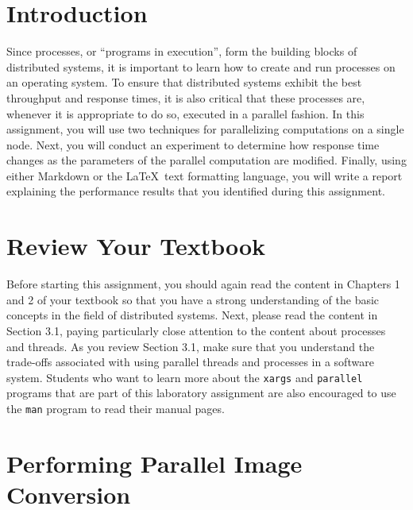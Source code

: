 


\usepackage[compact]{titlesec}



\section*{Introduction}

Since processes, or ``programs in execution'', form the building blocks of distributed systems, it is important to learn
how to create and run processes on an operating system. To ensure that distributed systems exhibit the best throughput
and response times, it is also critical that these processes are, whenever it is appropriate to do so, executed in a
parallel fashion. In this assignment, you will use two techniques for parallelizing computations on a single node. Next,
you will conduct an experiment to determine how response time changes as the parameters of the parallel computation are
modified.  Finally, using either Markdown or the \LaTeX~text formatting language, you will write a report explaining the
performance results that you identified during this assignment.

\section*{Review Your Textbook}

Before starting this assignment, you should again read the content in Chapters 1 and 2 of your textbook so that you have
a strong understanding of the basic concepts in the field of distributed systems. Next, please read the content in
Section 3.1, paying particularly close attention to the content about processes and threads. As you review Section 3.1,
make sure that you understand the trade-offs associated with using parallel threads and processes in a software system.
Students who want to learn more about the {\tt xargs} and {\tt parallel} programs that are part of this laboratory
assignment are also encouraged to use the {\tt man} program to read their manual pages.

\section*{Performing Parallel Image Conversion}

